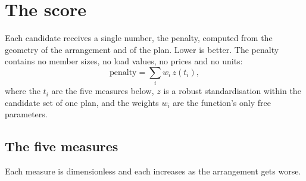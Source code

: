 \section{The score}
\label{sec:score}

Each candidate receives a single number, the penalty, computed from the
geometry of the arrangement and of the plan. Lower is better. The penalty
contains no member sizes, no load values, no prices and no units:
\begin{equation}
\text{penalty} = \sum_{i} w_i \, z(t_i),
\label{eq:penalty}
\end{equation}
where the $t_i$ are the five measures below, $z$ is a robust
standardisation within the candidate set of one plan, and the weights
$w_i$ are the function's only free parameters.

\subsection{The five measures}

Each measure is dimensionless and each increases as the arrangement gets
worse.

